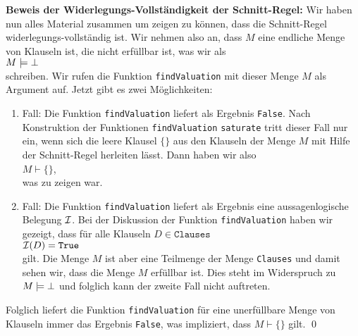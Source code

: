 \noindent
\textbf{Beweis der Widerlegungs-Vollständigkeit der Schnitt-Regel:}
Wir haben nun alles Material zusammen um zeigen zu können, dass die Schnitt-Regel
widerlegungs-vollständig ist.  Wir nehmen also an, dass $M$ eine endliche Menge von Klauseln ist,  die nicht
erfüllbar ist, was wir als
\\[0.2cm]
\hspace*{1.3cm}
$M \models \bot$ 
\\[0.2cm]
schreiben.  Wir rufen die Funktion \texttt{findValuation} mit dieser Menge $M$ als Argument auf.
Jetzt gibt es zwei Möglichkeiten:
\begin{enumerate}
\item Fall: Die Funktion \texttt{findValuation} liefert als Ergebnis \texttt{False}.  Nach
      Konstruktion der Funktionen \texttt{findValuation} \texttt{saturate} tritt dieser Fall nur
      ein, wenn sich die leere Klausel $\{\}$ aus den Klauseln der Menge $M$ mit Hilfe der
      Schnitt-Regel herleiten lässt.  Dann haben wir also
      \\[0.2cm]
      \hspace*{1.3cm}
      $M \vdash \{\}$,
      \\[0.2cm]
      was zu zeigen war.
\item Fall: Die Funktion \texttt{findValuation} liefert als Ergebnis eine aussagenlogische Belegung
      $\mathcal{I}$.  Bei der Diskussion der Funktion \texttt{findValuation} haben wir gezeigt, dass für
      alle Klauseln $D \in \texttt{Clauses}$
      \\[0.2cm]
      \hspace*{1.3cm}
      $\mathcal{I}(D) = \texttt{True}$
      \\[0.2cm]
      gilt.  Die Menge $M$ ist aber eine Teilmenge der Menge \texttt{Clauses} und damit sehen wir, dass die
      Menge $M$ erfüllbar ist.  Dies steht im Widerspruch zu $M \models \bot$ und folglich kann der
      zweite Fall nicht auftreten. 
\end{enumerate}
Folglich liefert die Funktion \texttt{findValuation} für eine unerfüllbare Menge von Klauseln immer
das Ergebnis \texttt{False}, was impliziert, dass $M \vdash \{\}$ gilt.  \qed

